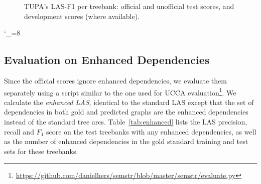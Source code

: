 \documentclass[11pt,a4paper]{article}
\begin{document}
\begin{figure*}[h]
    \caption{TUPA's LAS-F1 per treebank: official and unofficial test scores, and development scores (where available).
    \label{fig:test_per_corpus}}
\end{figure*}
\catcode`\_=8


\subsection{Evaluation on Enhanced Dependencies}\label{sec:enhanced_results}

Since the official scores ignore enhanced dependencies,
we evaluate them separately using a script similar to the one used for UCCA
evaluation\footnote{\url{https://github.com/danielhers/semstr/blob/master/semstr/evaluate.py}}.
We calculate the \textit{enhanced LAS},
identical to the standard LAS except that the set of dependencies
in both gold and predicted graphs are the enhanced dependencies instead
of the standard tree arcs.
Table~\ref{tab:enhanced} lists the LAS precision, recall and $F_1$ score
on the test treebanks with any enhanced dependencies,
as well as the number of enhanced dependencies in the gold standard
training and test sets for these treebanks.
\end{document}
